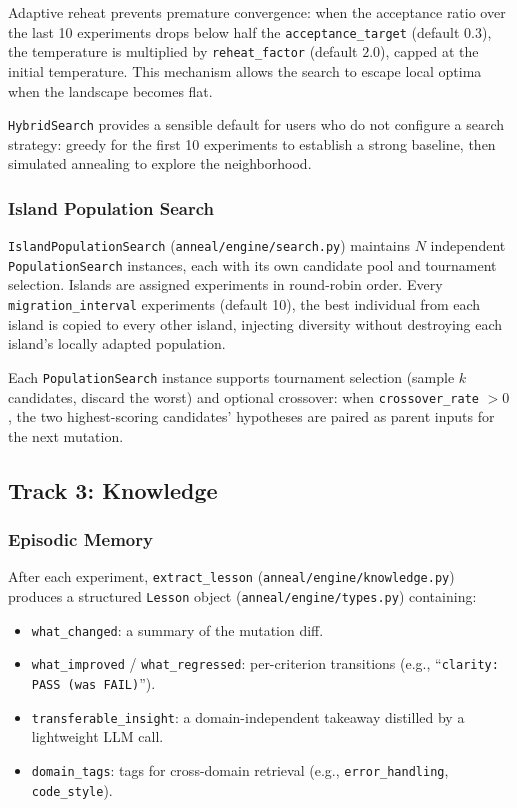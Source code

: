 Adaptive reheat prevents premature convergence: when the acceptance ratio over the last 10 experiments drops below half the \texttt{acceptance\_target} (default $0.3$), the temperature is multiplied by \texttt{reheat\_factor} (default $2.0$), capped at the initial temperature.
This mechanism allows the search to escape local optima when the landscape becomes flat.

\texttt{HybridSearch} provides a sensible default for users who do not configure a search strategy: greedy for the first 10 experiments to establish a strong baseline, then simulated annealing to explore the neighborhood.

\subsubsection{Island Population Search}\label{sec:island-search}

\texttt{IslandPopulationSearch} (\texttt{anneal/engine/search.py}) maintains $N$ independent \texttt{PopulationSearch} instances, each with its own candidate pool and tournament selection.
Islands are assigned experiments in round-robin order.
Every \texttt{migration\_interval} experiments (default 10), the best individual from each island is copied to every other island, injecting diversity without destroying each island's locally adapted population.

Each \texttt{PopulationSearch} instance supports tournament selection (sample $k$ candidates, discard the worst) and optional crossover: when \texttt{crossover\_rate} $> 0$, the two highest-scoring candidates' hypotheses are paired as parent inputs for the next mutation.

\subsection{Track 3: Knowledge}\label{sec:track-knowledge}

\subsubsection{Episodic Memory}\label{sec:episodic-memory}

After each experiment, \texttt{extract\_lesson} (\texttt{anneal/engine/knowledge.py}) produces a structured \texttt{Lesson} object (\texttt{anneal/engine/types.py}) containing:
\begin{itemize}
    \item \texttt{what\_changed}: a summary of the mutation diff.
    \item \texttt{what\_improved} / \texttt{what\_regressed}: per-criterion transitions (e.g., ``\texttt{clarity: PASS (was FAIL)}'').
    \item \texttt{transferable\_insight}: a domain-independent takeaway distilled by a lightweight LLM call.
    \item \texttt{domain\_tags}: tags for cross-domain retrieval (e.g., \texttt{error\_handling}, \texttt{code\_style}).
\end{itemize}

